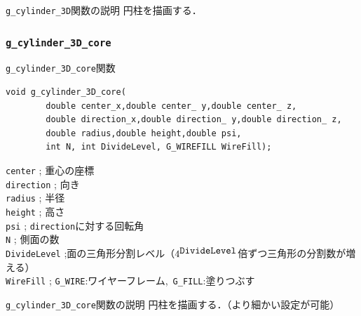 \documentclass[a4paper,12pt]{jsarticle}%
\begin{document}
\begin{itembox}[l]{\texttt{g\_cylinder\_3D}関数の説明}
円柱を描画する．
\end{itembox}



\clearpage
\subsubsection{\texttt{g\_cylinder\_3D\_core}}

\begin{itembox}[l]{\texttt{g\_cylinder\_3D\_core}関数}
\begin{verbatim}
void g_cylinder_3D_core(
        double center_x,double center_ y,double center_ z,
        double direction_x,double direction_ y,double direction_ z,
        double radius,double height,double psi,
        int N, int DivideLevel, G_WIREFILL WireFill);
\end{verbatim}
\verb|center| ; 重心の座標\\
\verb|direction| ; 向き\\
\verb|radius| ; 半径\\
\verb|height| ; 高さ\\
\verb|psi| ; \verb|direction|に対する回転角\\
\verb|N| ; 側面の数\\
\verb|DivideLevel| ;面の三角形分割レベル（$4^{\verb|DivideLevel|}$倍ずつ三角形の分割数が増える）\\
\verb|WireFill| ; \verb|G_WIRE|:ワイヤーフレーム,\ \verb|G_FILL|:塗りつぶす \\
\end{itembox}

\begin{itembox}[l]{\texttt{g\_cylinder\_3D\_core}関数の説明}
円柱を描画する．（より細かい設定が可能）
\end{itembox}
\end{document}
